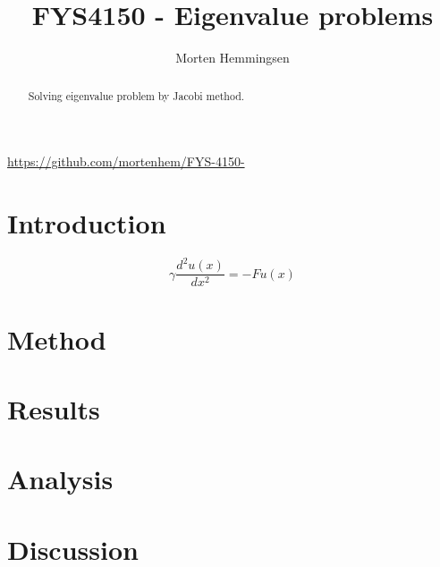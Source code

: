 \documentclass[12]{article}
\title{FYS4150 - Eigenvalue problems}
\author{Morten Hemmingsen}
\begin{document}
\maketitle
\url{https://github.com/mortenhem/FYS-4150-}


\begin{abstract}
Solving eigenvalue problem by Jacobi method.
\end{abstract}





\section{Introduction}

$$\gamma\frac{d^{2}u(x)}{dx^{2}}=-Fu(x)$$






\section{Method}



\section{Results}


\section{Analysis}

\section{Discussion}
\end{document}
